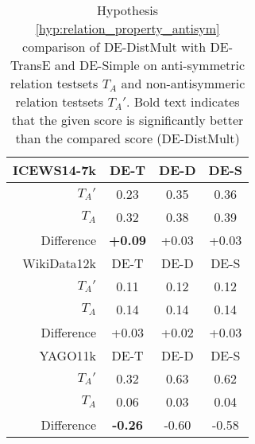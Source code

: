 \begin{table}[htb]
\centering
\begin{minipage}{\columnwidthcaption}
\centering
\caption{Hypothesis \autoref{hyp:relation_property_antisym} comparison of DE-DistMult with DE-TransE and DE-Simple on anti-symmetric relation testsets $T_A$ and non-antisymmeric relation testsets $T_A'$. Bold text indicates that the given score is significantly better than the compared score (DE-DistMult)}
\vspace{-3mm}

\begin{tabular}{r|ccc}\hline
\mbox{ICEWS14-7k} & DE-T & DE-D & DE-S \\ \hline
$T_A'$ & 0.23 & 0.35 & 0.36 \\
$T_A$ & 0.32 & 0.38 & 0.39 \\ \hline
Difference & \textbf{+0.09} & +0.03 & +0.03 \\ \hline\hline
WikiData12k & DE-T & DE-D & DE-S \\ \hline
$T_A'$ & 0.11 & 0.12 & 0.12 \\
$T_A$ & 0.14 & 0.14 & 0.14 \\ \hline
Difference & +0.03 & +0.02 & +0.03 \\ \hline\hline
YAGO11k & DE-T & DE-D & DE-S \\ \hline
$T_A'$ & 0.32 & 0.63 & 0.62 \\
$T_A$ & 0.06 & 0.03 & 0.04 \\ \hline
Difference & \textbf{-0.26} & -0.60 & -0.58 \\ \hline
\end{tabular}

\label{tab:hypothesis_3_b_comparison}
\end{minipage}
\end{table}

